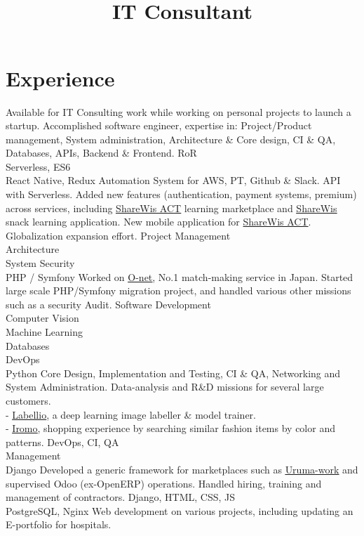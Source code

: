\documentclass[a4paper,11pt]{cv4tw}%
\title{\\ IT Consultant}
\begin{document}
\section{Experience}
{}
{Available for IT Consulting work while working on personal projects to launch a startup.
Accomplished software engineer, expertise in: Project/Product management, System administration,
Architecture \& Core design, CI \& QA, Databases, APIs, Backend \& Frontend.
}
{RoR\\Serverless, ES6\\React Native, Redux}
{Automation System for AWS, PT, Github \& Slack. API with Serverless. Added
new features (authentication, payment systems, premium) across services,
including \underline{\href{https://act.share-wis.com}{ShareWis ACT}} learning
marketplace and \underline{\href{https://www.share-wis.com}{ShareWis}} snack
learning application.
New mobile application for \href{https://act.share-wis.com}{ShareWis ACT}.
Globalization expansion effort.
}
{Project Management\\Architecture\\System Security\\PHP / Symfony}
{Worked on \underline{\href{http://onet.rakuten.co.jp/}{O-net}}, No.1
  match-making service in Japan. Started large scale PHP/Symfony migration
  project, and handled various other missions such as a security Audit.
}
{Software Development\\Computer Vision\\Machine Learning\\Databases\\DevOps\\Python}
{Core Design, Implementation and Testing, CI \& QA, Networking and System Administration.
Data-analysis and R\&D missions for several large customers.\\
- \underline{\href{http://www.labell.io/}{Labellio}}, a deep
    learning image labeller \& model trainer.\\
- \underline{\href{http://iromo.jp}{Iromo}}, shopping experience by
    searching similar fashion items by color and patterns.
}
{DevOps, CI, QA\\Management\\Django}
{Developed a generic framework for marketplaces such as
  \underline{\href{https://uruma-work.com}{Uruma-work}} and supervised Odoo
  (ex-OpenERP) operations. Handled hiring, training and management of
  contractors.
}
{Django, HTML, CSS, JS\\PostgreSQL, Nginx}
{Web development on various projects, including updating an E-portfolio for
hospitals.
}
\end{document}
